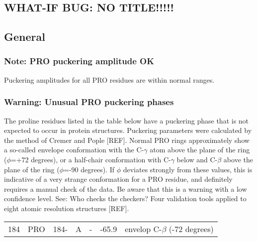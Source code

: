 \documentclass[a4paper]{article}
\def\showsect#1{
  \thesect\gdef\thesect{}
  \thessect\gdef\thessect{}
  \subsubsection{#1}
}
\gdef\thesect{\pagebreak[2]\section{WHAT-IF BUG: NO TITLE!!!!!}}
\gdef\thessect{\subsection{General}}
\begin{document}
\begin{note}
\showsect{Note: PRO puckering amplitude OK}
Puckering amplitudes for all PRO residues are within normal ranges.
\end{note}

\begin{warning}
\showsect{Warning: Unusual PRO puckering phases}
The proline residues listed in the table below have a puckering phase that is
not expected to occur in protein structures. Puckering parameters were
calculated by the method of Cremer and Pople [REF]. Normal PRO rings
approximately show a so-called envelope conformation with the C-$\gamma$ atom
above the plane of the ring ($\phi$=+72 degrees), or a half-chair conformation
with C-$\gamma$ below and C-$\beta$ above the plane of the ring ($\phi$=-90 degrees).
If $\phi$ deviates strongly from these values, this is indicative of a very
strange conformation for a PRO residue, and definitely requires a manual
check of the data. Be aware that this is a warning with a low confidence
level. See: Who checks the checkers? Four validation tools applied to eight
atomic resolution structures [REF].
 
\begin{center}
 
\begin{supertabular}{rr@{ (}r@{) }rlrl}
  184&PRO & 184-&A &-& -65.9&envelop C-$\beta$ (-72 degrees)\\
\end{supertabular}\end{center}
\end{warning}
\end{document}
